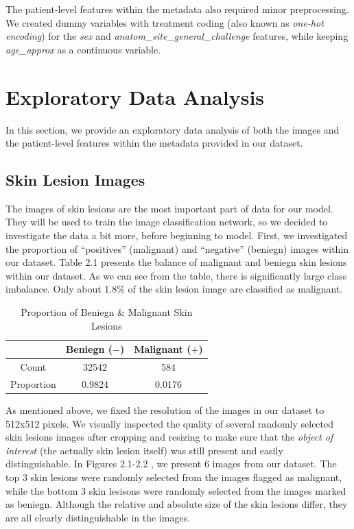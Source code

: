 \documentclass [MAS] {uclathes}
\begin{document}
The patient-level features within the metadata also required minor preprocessing. We created dummy variables with treatment coding (also known as \textit{one-hot encoding}) for the \textit{sex} and \textit{anatom\_site\_general\_challenge} features, while keeping \textit{age\_approx} as a continuous variable.


\section{Exploratory Data Analysis}

In this section, we provide an exploratory data analysis of both the images and the patient-level features within the metadata provided in our dataset.

\subsection{Skin Lesion Images}

The images of skin lesions are the most important part of data for our model. They will be used to train the image classification network, so we decided to investigate the data a bit more, before beginning to model. First, we investigated the proportion of ``positives'' (malignant) and ``negative'' (beniegn) images within our dataset. Table 2.1 presents the balance of malignant and beniegn skin lesions within our dataset. As we can see from the table, there is significantly large class imbalance. Only about 1.8\% of the skin lesion image are classified as malignant. 

\begin{table}[h!]
\centering
\begin{tabular}{| c | c | c |} 
\hline
& Beniegn ($-$) & Malignant ($+$) \\ 
\hline
\hline
Count & 32542 & 584\\
\hline
Proportion & 0.9824 & 0.0176\\
\hline  
\end{tabular}
\label{tab:propMel}
\caption{Proportion of Beniegn \& Malignant Skin Lesions}
\end{table}


As mentioned above, we fixed the resolution of the images in our dataset to 512x512 pixels. We visually inspected the quality of several randomly selected skin lesions images after cropping and resizing to make sure that the \textit{object of interest} (the actually skin lesion itself) was still present and easily distinguishable. In Figures 2.1-2.2 , we present 6 images from our dataset. The top 3 skin lesions were randomly selected from the images flagged as malignant, while the bottom 3 skin lesisons were randomly selected from the images marked as beniegn. Although the relative and absolute size of the skin lesions differ, they are all clearly distinguishable in the images. 
\end{document}
